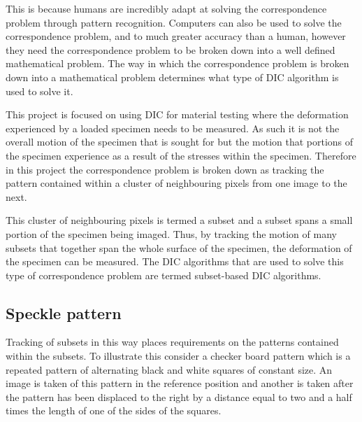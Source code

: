 \documentclass[12pt,oneside,openany,a4paper, %
english, %
masters-t, goldenblock]{usthesis}
\begin{document}

This is because humans are incredibly adapt at solving the correspondence problem through pattern recognition. Computers can also be used to solve the correspondence problem, and to much greater accuracy than a human, however they need the correspondence problem to be broken down into a well defined mathematical problem. The way in which the correspondence problem is broken down into a mathematical problem determines what type of DIC algorithm is used to solve it. 



This project is focused on using DIC for material testing where the deformation experienced by a loaded specimen needs to be measured. As such it is not the overall motion of the specimen that is sought for but the motion that portions of the specimen experience as a result of the stresses within the specimen. Therefore in this project the correspondence problem is broken down as tracking the pattern contained within a cluster of neighbouring pixels from one image to the next.

This cluster of neighbouring pixels is termed a subset and a subset spans a small portion of the specimen being imaged. Thus, by tracking the motion of many subsets that together span the whole surface of the specimen, the deformation of the specimen can be measured. The DIC algorithms that are used to solve this type of correspondence problem are termed subset-based DIC algorithms.

\subsection{Speckle pattern}
Tracking of subsets in this way places requirements on the patterns contained within the subsets. %
To illustrate this consider a checker board pattern which is a repeated pattern of alternating black and white squares of constant size. An image is taken of this pattern in the reference position and another is taken after the pattern has been displaced to the right by a distance equal to two and a half times the length of one of the sides of the squares.
\end{document}
